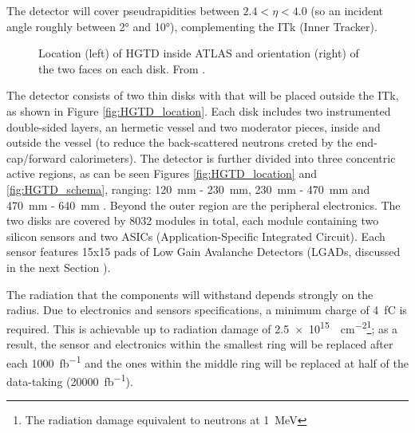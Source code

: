 The detector will cover pseudrapidities between $2.4 < \eta < 4.0$ (so an incident angle roughly between 2° and 10°), complementing the ITk (Inner Tracker).
\begin{figure}[!ht]
    \centering
    \hfill
    \centering
    \captionsetup{width=.8\linewidth}
    \caption{Location (left) of HGTD inside ATLAS and orientation (right) of the two faces on each disk. From \cite{cernTechnicalDesign}.}
\end{figure}

The detector consists of two thin disks with that will be placed outside the ITk, as shown in Figure \ref{fig:HGTD_location}. Each disk includes two instrumented double-sided layers, an hermetic vessel and two moderator pieces, inside and outside the vessel (to reduce the back-scattered neutrons creted by the end-cap/forward calorimeters). The detector is further divided into three concentric active regions, as can be seen Figures \ref{fig:HGTD_location} and \ref{fig:HGTD_schema}, ranging: \qty{120}{\milli\meter} - \qty{230}{\milli\meter}, \qty{230}{\milli\meter} - \qty{470}{\milli\meter} and \qty{470}{\milli\meter} - \qty{640}{\milli\meter} \cite{CERN-LHCC-2020-007}. Beyond the outer region are the peripheral electronics.
The two disks are covered by 8032 modules in total, each module containing two silicon sensors and two ASICs (Application-Specific Integrated Circuit). Each sensor features 15x15 pads of Low Gain Avalanche Detectors (LGADs, discussed in the next Section ).

The radiation that the components will withstand depends strongly on the radius. Due to electronics and sensors specifications, a minimum charge of \qty{4}{\femto\coulomb} is required. This is achievable up to radiation damage of \qty{2.5e15}{\neutroneq\centi\meter^{-2}}\footnote{The radiation damage equivalent to neutrons at \qty{1}{\mega\electronvolt}}; as a result, the sensor and electronics within the smallest ring will be replaced after each \qty{1000}{\femto\barn^{-1}} and the ones within the middle ring will be replaced at half of the data-taking (\qty{20000}{\femto\barn^{-1}}).

